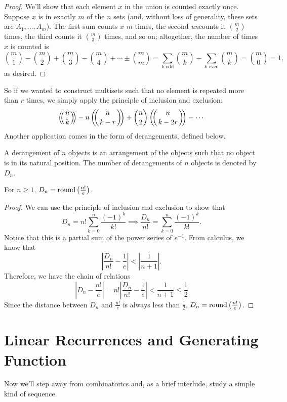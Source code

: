\documentclass[../m055main.tex]{subfiles}
\begin{document}
\begin{proof}
    We'll show that each element $x$ in the union is counted exactly once.
    Suppose $x$ is in exactly $m$ of the $n$ sets (and, without loss of generality, these sets are $A_1, \ldots, A_m$).
    The first sum counts $x$ $m$ times, the second \textit{un}counts it ${m \choose 2}$ times, the third counts it ${m \choose 3}$ times, and so on; altogether, the number of times $x$ is counted is
    \[ {m \choose 1} - {m \choose 2} + {m \choose 3} - {m \choose 4} + \cdots \pm {m \choose m} = \sum_{k\text{ odd}} {m \choose k} - \sum_{k\text{ even}} {m \choose k} = {m \choose 0} = 1, \]
    as desired.
\end{proof}

So if we wanted to construct multisets such that no element is repeated more than $r$ times, we simply apply the principle of inclusion and exclusion:
\[ \mchoose{n}{k} - n \mchoose{n}{k-r} + {n \choose 2} \mchoose{n}{k-2r} - \cdots \]
Another application comes in the form of derangements, defined below.

\begin{definition}[Derangement]
    A derangement of $n$ objects is an arrangement of the objects such that no object is in its natural position.
    The number of derangements of $n$ objects is denoted by $D_n$.
\end{definition}

\begin{theorem}[]
    For $n \geq 1$, $D_n = \textrm{round} \left( \frac{n!}{e} \right)$.
\end{theorem}

\begin{proof}
    We can use the principle of inclusion and exclusion to show that
    \[ D_n = n! \sum_{k=0}^{n} \frac{(-1)^k}{k!} \implies \frac{D_n}{n!} = \sum_{k=0}^{n} \frac{(-1)^k}{k!}. \]
    Notice that this is a partial sum of the power series of $e^{-1}$.
    From calculus, we know that
    \[ \left| \frac{D_n}{n!} - \frac{1}{e} \right| < \left| \frac{1}{n+1} \right|. \]
    Therefore, we have the chain of relations
    \[ \left| D_n - \frac{n!}{e} \right| = n! \left| \frac{D_n}{n!} - \frac{1}{e} \right| < \frac{1}{n+1} \leq \frac{1}{2} \]
    Since the distance between $D_n$ and $\frac{n!}{e}$ is always less than $\frac{1}{2}$, $D_n =\textrm{round}\left( \frac{n!}{e} \right)$.
\end{proof}

\section{Linear Recurrences and Generating Function}
Now we'll step away from combinatorics and, as a brief interlude, study a simple kind of sequence.
\end{document}
